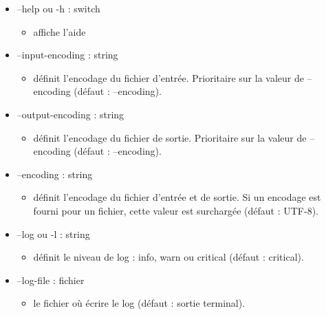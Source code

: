 \documentclass[manual-fr.tex]{subfiles}
\begin{document}
\begin{itemize}
        \begin{itemize}
            \item[] --help ou -h : switch
                \begin{itemize}
                    \item[] affiche l'aide
                \end{itemize}
            \item[] --input-encoding : string
                \begin{itemize}
                    \item[] définit l'encodage du fichier d'entrée. Prioritaire sur la valeur de --encoding (défaut : --encoding).
                \end{itemize}
            \item[] --output-encoding : string
                \begin{itemize}
                    \item[] définit l'encodage du fichier de sortie. Prioritaire sur la valeur de --encoding (défaut : --encoding).
                \end{itemize}
            \item[] --encoding : string
                \begin{itemize}
                    \item[] définit l'encodage du fichier d'entrée et de sortie. Si un encodage est fourni pour un fichier,
                        cette valeur est surchargée (défaut : UTF-8).
                \end{itemize}
            \item[] --log ou -l : string
                \begin{itemize}
                    \item[] définit le niveau de log : info, warn ou critical (défaut : critical).
                \end{itemize}
            \item[] --log-file : fichier
                \begin{itemize}
                    \item[] le fichier où écrire le log (défaut : sortie terminal).
                \end{itemize}
        \end{itemize}
\end{itemize}
\end{document}
